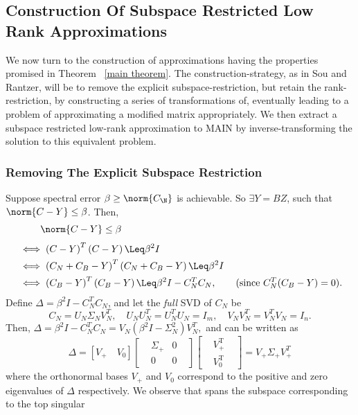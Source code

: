 \subsection{Construction Of Subspace Restricted Low Rank Approximations}
We now turn to the construction of approximations having the properties promised in Theorem~ \ref{main theorem}. The construction-strategy, as in Sou and Rantzer, will be to remove the explicit subspace-restriction, but retain the rank-restriction, by constructing a series of transformations of, eventually leading to a problem of approximating a modified matrix appropriately. We then extract a subspace restricted low-rank approximation to MAIN by inverse-transforming the solution to this equivalent problem.

\subsubsection{Removing The Explicit Subspace Restriction}
Suppose spectral error $\beta \geq \norm{C_{\N}}$ is achievable. So
 $\exists Y = BZ$, such that $\norm{C - Y} \leq \beta$. Then,
\begin{align*}
&\phantom{\iff}\norm{C - Y} \leq \beta \\[3pt]
& \iff \left( {C} - {Y} \right)^T \left( {C} - {Y} \right) 
\Leq \beta^2 I \\
& \iff \left( {C}_N + {C}_B - {Y} \right)^T \left( {C}_N + {C}_B - {Y} \right) \Leq \beta^2 I \\
& \iff \left( {C}_B - {Y} \right)^T \left( {C}_B - {Y} \right) \Leq \beta^2 I - {C}_N ^T {C}_N, \qquad (\text{since }  {C}_N^T({C}_B - {Y})=0).
\end{align*}
Define 
$\Delta = \beta^2 I - {C}_N ^T {C}_N$, and let the \emph{full} SVD of $C_N$ be 
\[ C_N = U_N\Sigma_NV_N^T, \quad U_NU_N^T=U_N^TU_N=I_m, \quad V_NV_N^T = V_N^TV_N = I_n. \]
Then, $\Delta = \beta^2 I - {C}_N ^T {C}_N = V_N(\beta^2I - \Sigma_N^2)V_N^T,$ and can be written as
\[ \Delta =  [  V_+ \quad V_0  ]
\begin{bmatrix}
&\Sigma_+ & 0 &\\
&0 & 0&
\end{bmatrix}
\begin{bmatrix}
&V_+^{\text{T}}&\\
&V_0^{\text{T}}&
\end{bmatrix} = V_+ \Sigma_+ V_+^T \]
where the orthonormal bases $V_+$ and $V_0$ correspond to the positive and zero eigenvalues of $\Delta$ respectively. We observe that
 spans the subspace corresponding to the top singular
